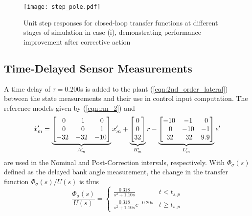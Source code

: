 \begin{figure}[h!]
	\centering
	\texttt{[image: step\_pole.pdf]}
	\caption{Unit step responses for closed-loop transfer functions at different stages of simulation in case (i), demonstrating performance improvement after corrective action}
	\label{fig:step_pole}
\end{figure}

\subsection{Time-Delayed Sensor Measurements}
A time delay of $\tau = 0.200$s is added to the plant (\ref{eqn:2nd_order_lateral}) between the state measurements and their use in control input computation. The reference models given by (\ref{eqn:rm_2}) and 
\begin{equation}
	\dot{x}_m' = \underbrace{\begin{bmatrix}
		\hfil 0 & \hfil 1 & \hfil 0\\ \hfil 0 & \hfil 0 & \hfil 1 \\ -32 & -32 & -10
	\end{bmatrix}}_{A_m'} x_m' + \underbrace{\begin{bmatrix}
		0 \\ 0 \\ 32
	\end{bmatrix}}_{B_m'} r - \underbrace{\begin{bmatrix}
		-10 & -1 & \hfil 0 \\ \hfil 0 & \hfil -10 & \hfil -1 \\ \hfil 32 & \hfil 32 & \hfil 9.9
	\end{bmatrix}}_{L_m'} e'
	\label{eqn:rm_3_delay}
\end{equation}
\noindent are used in the Nominal and Post-Correction intervals, respectively. With $\Phi_\sigma(s)$ defined as the delayed bank angle measurement, the change in the transfer function $\Phi_\sigma(s)/U(s)$ is thus
\begin{equation}
		\frac{\Phi_\sigma(s)}{U(s)} = \begin{cases}
			\frac{0.318}{s^2 + 1.10s} & t < t_{s,p}\\
			\frac{0.318}{s^2 + 1.10s}e^{-0.20 s} & t \geq t_{s,p}
		\end{cases} 
\end{equation}

